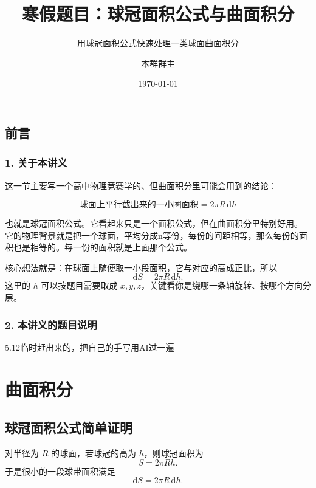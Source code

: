 \documentclass[lang=cn,newtx,10pt,scheme=chinese]{elegantbook}
\title{寒假题目：球冠面积公式与曲面积分} %
\subtitle{用球冠面积公式快速处理一类球面曲面积分}
\author{本群群主}
\institute{本群}
\date{\today}
\begin{document}
\maketitle
\frontmatter

\newpage

\section*{前言}

\subsection*{\textbf{1. 关于本讲义}}
这一节主要写一个高中物理竞赛学的、但曲面积分里可能会用到的结论：

\[
\boxed{\text{球面上平行截出来的一小圈面积}=2\pi R\,\mathrm{d}h}
\]

也就是球冠面积公式。它看起来只是一个面积公式，但在曲面积分里特别好用。
它的物理背景就是把一个球面，平均分成n等份，每份的间距相等，那么每份的面积也是相等的。每一份的面积就是上面那个公式。


核心想法就是：在球面上随便取一小段面积，它与对应的高成正比，所以
\[
\mathrm{d}S=2\pi R\,\mathrm{d}h.
\]
这里的 $h$ 可以按题目需要取成 $x,y,z$，关键看你是绕哪一条轴旋转、按哪个方向分层。

\subsection*{\textbf{2. 本讲义的题目说明}}
5.12临时赶出来的，把自己的手写用AI过一遍

\newpage

\tableofcontents
\mainmatter

\chapter{曲面积分}

\section{球冠面积公式简单证明}

\begin{theorem}[球冠面积公式]
对半径为 $R$ 的球面，若球冠的高为 $h$，则球冠面积为
\[
S=2\pi Rh.
\]
于是很小的一段球带面积满足
\[
\mathrm{d}S=2\pi R\,\mathrm{d}h.
\]
\end{theorem}
\end{document}
